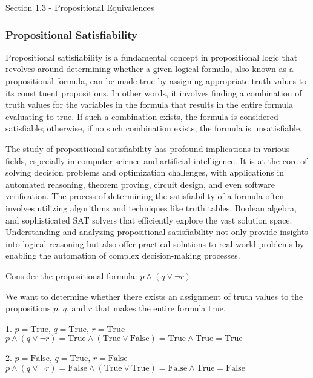 \begin{notes}{Section 1.3 - Propositional Equivalences}
    \subsubsection*{Propositional Satisfiability}

    Propositional satisfiability is a fundamental concept in propositional logic that revolves around determining whether a given logical formula, also known as a propositional formula, can be made true by assigning appropriate 
    truth values to its constituent propositions. In other words, it involves finding a combination of truth values for the variables in the formula that results in the entire formula evaluating to true. If such a combination 
    exists, the formula is considered satisfiable; otherwise, if no such combination exists, the formula is unsatisfiable.

    The study of propositional satisfiability has profound implications in various fields, especially in computer science and artificial intelligence. It is at the core of solving decision problems and optimization challenges, 
    with applications in automated reasoning, theorem proving, circuit design, and even software verification. The process of determining the satisfiability of a formula often involves utilizing algorithms and techniques like 
    truth tables, Boolean algebra, and sophisticated SAT solvers that efficiently explore the vast solution space. Understanding and analyzing propositional satisfiability not only provide insights into logical reasoning but 
    also offer practical solutions to real-world problems by enabling the automation of complex decision-making processes.

    \begin{highlight}
        Consider the propositional formula: \(p \land (q \lor \neg r)\) \vspace*{1em}

        We want to determine whether there exists an assignment of truth values to the propositions \(p\), \(q\), and \(r\) that makes the entire formula true.
    

        1. \(p = \text{True}\), \(q = \text{True}\), \(r = \text{True}\)
        \(p \land (q \lor \neg r) = \text{True} \land (\text{True} \lor \text{False}) = \text{True} \land \text{True} = \text{True}\)
    
        2. \(p = \text{False}\), \(q = \text{True}\), \(r = \text{False}\)
        \(p \land (q \lor \neg r) = \text{False} \land (\text{True} \lor \text{True}) = \text{False} \land \text{True} = \text{False}\)
    

\end{highlight}
\end{notes}
